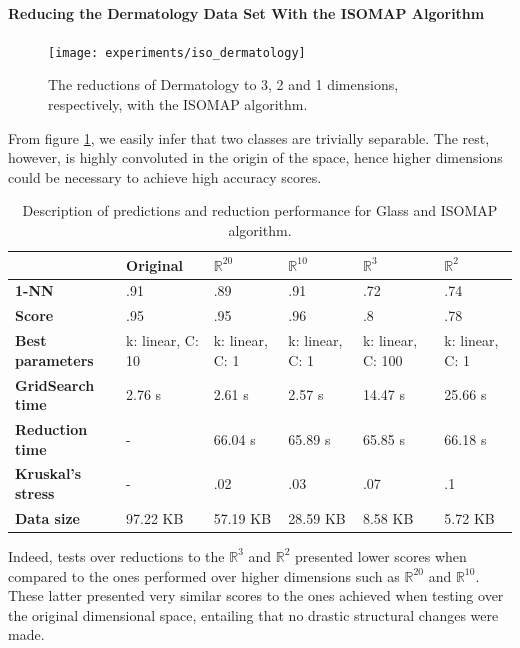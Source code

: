 \newpage
\paragraph{Reducing the Dermatology Data Set With the ISOMAP Algorithm}

\begin{figure}[H]
	\centering
	\captionsetup{justification=centering}
	\texttt{[image: experiments/iso\_dermatology]}
	\caption{The reductions of Dermatology to 3, 2 and 1 dimensions, respectively, with the ISOMAP algorithm.}
	\label{fig:dsdermatologyiso}
\end{figure}

From figure \ref{fig:dsdermatologyiso}, we easily infer that two classes are trivially separable. The rest, however, is highly convoluted in the origin of the space, hence higher dimensions could be necessary to achieve high accuracy scores.

\begin{table}[H]
	\centering
	
	\begin{tabular}{|p{.15\linewidth}|p{.12\linewidth}|p{.12\linewidth}|p{.12\linewidth}|p{.12\linewidth}|p{.12\linewidth}|}
		\hline
		& \textbf{Original} & $\mathbb{R}^{20}$ & $\mathbb{R}^{10}$ & $\mathbb{R}^3$ & $\mathbb{R}^2$ \\\hline
		\textbf{1-NN} & .91 & .89 & .91 & .72 & .74 \\\hline
		\textbf{Score} & .95 & .95 & .96 & .8 & .78 \\\hline
		\textbf{Best parameters} & k: linear, C: 10 & k: linear, C: 1 & k: linear, C: 1 & k: linear, C: 100 & k: linear, C: 1\\\hline
		\textbf{GridSearch time} & 2.76 s & 2.61 s & 2.57 s & 14.47 s & 25.66 s \\\hline
		\textbf{Reduction time} & - & 66.04 s & 65.89 s & 65.85 s & 66.18 s \\\hline
		\textbf{Kruskal's stress} & - & .02 & .03 & .07 & .1 \\\hline
		\textbf{Data size} & 97.22 KB & 57.19 KB & 28.59 KB & 8.58 KB & 5.72 KB \\\hline
	\end{tabular}
	\captionsetup{justification=centering}
	\caption{Description of predictions and reduction performance for Glass and ISOMAP algorithm.}
\end{table}

Indeed, tests over reductions to the $\mathbb{R}^3$ and $\mathbb{R}^2$ presented lower scores when compared to the ones performed over higher dimensions such as $\mathbb{R}^{20}$ and $\mathbb{R}^{10}$. These latter presented very similar scores to the ones achieved when testing over the original dimensional space, entailing that no drastic structural changes were made.

